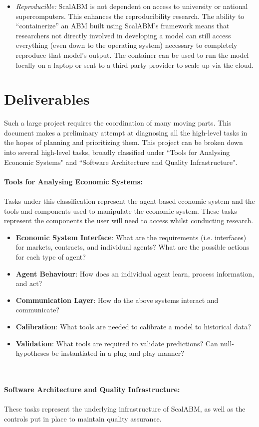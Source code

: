 \documentclass[a4paper]{article}
\begin{document}
\begin{itemize}
\item \textit{Reproducible:} ScalABM is not dependent on access to university or national supercomputers. This enhances the reproducibility research.  The ability to ``containerize'' an ABM built using ScalABM's framework means that researchers not directly involved in developing a model can still access everything (even down to the operating system) necessary to completely reproduce that model's output. The container can be used to run the model locally on a laptop or sent to a third party provider to scale up via the cloud.

\end{itemize}

\section{Deliverables}

Such a large project requires the coordination of many moving parts. This document makes a preliminary attempt at diagnosing all the high-level tasks in the hopes of planning and prioritizing them. This project can be broken down into several high-level tasks, broadly classified under ``Tools for Analysing Economic Systems" and ``Software Architecture and Quality Infrastructure". 
\\
\\
\textbf{Tools for Analysing Economic Systems:}
\\
\\
Tasks under this classification represent the agent-based economic system and the tools and components used to manipulate the economic system. These tasks represent the components the user will need to access whilst conducting research.

\begin{itemize}
	\item \textbf{Economic System Interface}: What are the requirements (i.e. interfaces) for markets, contracts, and individual agents? What are the possible actions for each type of agent? 
    \item \textbf{Agent Behaviour}: How does an individual agent learn, process information, and act?
    \item \textbf{Communication Layer}: How do the above systems interact and communicate? 
    \item \textbf{Calibration}: What tools are needed to calibrate a model to historical data?
    \item \textbf{Validation}: What tools are required to validate predictions? Can null-hypotheses be instantiated in a plug and play manner?
    \end{itemize}
\\
\\
\textbf{Software Architecture and Quality Infrastructure:}
\\
\\
These tasks represent the underlying infrastructure of ScalABM, as well as the controls put in place to maintain quality assurance. 
\end{document}
